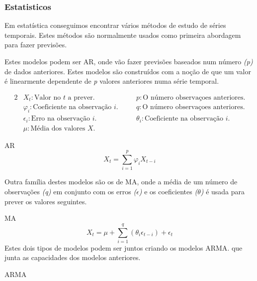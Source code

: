 \subsubsection{Estatisticos}

Em estatística conseguimos encontrar vários métodos de estudo de séries temporais. Estes métodos são normalmente usados como primeira abordagem para fazer previsões.\par
Estes modelos podem ser \gls{AR}, onde vão fazer previsões baseados num número \textit{(p)} de dados anteriores. Estes modelos são construídos com a noção de que um valor é linearmente dependente de \textit{p} valores anteriores numa série temporal.\par

\begin{alignat*}{2} 
    & X_{t} : \text{Valor no } t \text{ a prever.} &\quad& p : \text{O número observaçoes anteriores.} \\
    & \varphi_{i} : \text{Coeficiente na observação } i. &\quad& q : \text{O número observaçoes anteriores.} \\
    & \epsilon_{i} : \text{Erro na observação } i. &\quad& \theta_{i} : \text{Coeficiente na observação } i \text{.} \\ 
    & \mu : \text{Média dos valores } X \text{.} 
\end{alignat*}

\bigskip
\gls{AR} \\

\begin{equation} \label{eq:ar} 
    X_{t} = \sum_{i=1}^{p}\varphi_{i} X_{t-i} 
\end{equation}
\smallskip

Outra família destes modelos são os de \gls{MA}, onde a média de um número de observações \textit{(q)} em conjunto com os erros \textit{($\epsilon$)} e os coeficientes \textit{($\theta$)} é usada para prever os valores seguintes.\par
\bigskip
\gls{MA} \\

\begin{equation} \label{eq:ma} 
    X_{t} = \mu + \sum_{i=1}^{q}(\theta_{i} \epsilon_{t-i}) + \epsilon_{t}
\end{equation}
\smallskip
Estes dois tipos de modelos podem ser juntos criando os modelos \gls{ARMA}. que junta as capacidades dos modelos anteriores.\par

\bigskip
\gls{ARMA} \\

